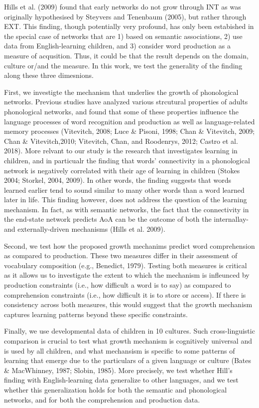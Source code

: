 \documentclass[english,floatsintext,man]{apa6}
\theoremstyle{definition}
\theoremstyle{definition}
\theoremstyle{definition}
\theoremstyle{remark}
\begin{document}
Hills et al. (2009) found that early networks do not grow through INT as
was originally hypothesised by Steyvers and Tenenbaum (2005), but rather
through EXT. This finding, though potentially very profound, has only
been estabished in the special case of networks that are 1) based on
semantic associations, 2) use data from English-learning children, and
3) consider word production as a measure of acqusition. Thus, it could
be that the result depends on the domain, culture or/and the measure. In
this work, we test the generality of the finding along these three
dimesnions.

First, we investigte the mechanism that underlies the growth of
phonological networks. Previous studies have analyzed various strcutural
properties of adults phonological networks, and found that some of these
properties influence the language processes of word recognition and
production as well as language-related memory processes (Vitevitch,
2008; Luce \& Pisoni, 1998; Chan \& Vitevitch, 2009; Chan \&
Vitevitch,2010; Vitevitch, Chan, and Roodenrys, 2012; Castro et al.
2018). More relvant to our study is the research that investigates
learning in children, and in particualr the finding that words'
connectivity in a phonological network is negatively correlated with
their age of learning in children (Stokes 2004; Storkel, 2004, 2009). In
other words, the finding suggests that words learned earlier tend to
sound similar to many other words than a word learned later in life.
This finding however, does not address the question of the learning
mechanism. In fact, as with semantic networks, the fact that the
connectivity in the end-state network predicts AoA can be the outcome of
both the internallay- and externally-driven mechanisms (Hills et al.
2009).

Second, we test how the proposed growth mechanims predict word
comprehension as compared to production. These two measures differ in
their assessment of vocabulary composition (e.g., Benedict, 1979).
Testing both measures is critical as it allows us to investigate the
extent to which the mechanism is infleunced by production constraints
(i.e., how difficult a word is to say) as compared to comprehension
constraints (i.e., how difficult it is to store or access). If there is
consistency across both measures, this would suggest that the growth
mechanism captures learning patterns beyond these specific constraints.

Finally, we use developmental data of children in 10 cultures. Such
cross-linguistic comparison is crucial to test what growth mechanism is
cognitively universal and is used by all children, and what mechansism
is specific to some patterns of learning that emerge due to the
particulars of a given language or culture (Bates \& MacWhinney, 1987;
Slobin, 1985). More precisely, we test whether Hill's finding with
English-learning data generalize to other languages, and we test whether
this generalization holds for both the semantic and phonological
networks, and for both the comprehension and production data.
\end{document}
